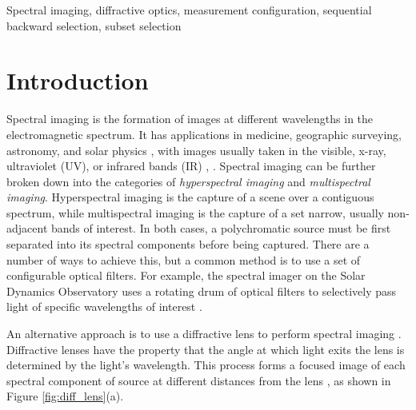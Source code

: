\documentclass{article}
\begin{document}
\begin{keywords}
Spectral imaging, diffractive optics, measurement configuration, sequential
backward selection, subset selection
\end{keywords}

\section{Introduction}
\label{sec:intro}
Spectral imaging is the formation of images at different wavelengths in the
electromagnetic spectrum. It has applications in medicine,
geographic surveying, astronomy, and solar physics , with images usually taken in the visible, x-ray,
ultraviolet (UV), or infrared bands (IR) \cite{shaw2003spectral},
\cite{garini2006spectral}. Spectral imaging can be further broken down into the
categories of \emph{hyperspectral imaging} and \emph{multispectral imaging}.
Hyperspectral imaging is the capture of a scene over a contiguous spectrum,
while multispectral imaging is the capture of a set narrow, usually non-adjacent
bands of interest. In both cases, a polychromatic source must be first separated
into its spectral components before being captured. There are a number of ways
to achieve this, but a common method is to use a set of configurable optical
filters. For example, the spectral imager on the Solar Dynamics Observatory uses
a rotating drum of optical filters to selectively pass light of specific
wavelengths of interest \cite{sdo}.



An alternative approach is to use a diffractive lens to perform spectral imaging
\cite{oktem2014icip}. Diffractive lenses have the property that the angle at
which light exits the lens is determined by the light's wavelength. This process
forms a focused image of each spectral component of source at different
distances from the lens \cite{attwood2017x}, as shown in Figure \ref{fig:diff_lens}(a).
\end{document}
